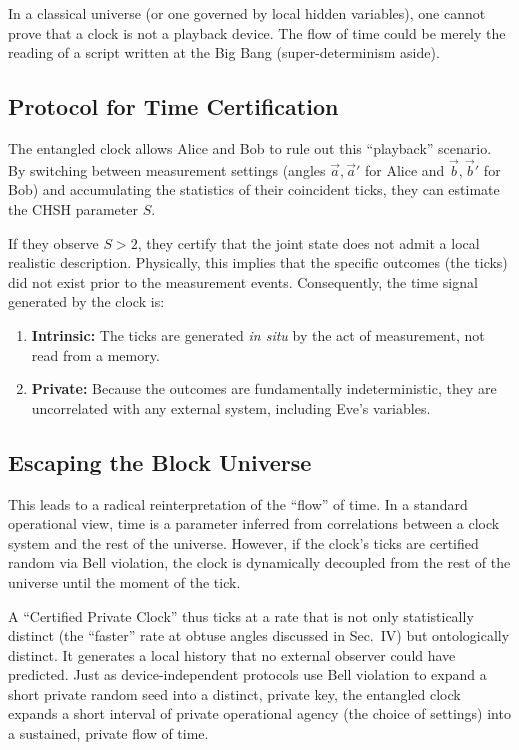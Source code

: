 \documentclass[entropy,article,submit,moreauthors,pdftex]{Definitions/mdpi}
\begin{document}
In a classical universe (or one governed by local hidden variables), one cannot prove that a clock is not a playback device. The flow of time could be merely the reading of a script written at the Big Bang (super-determinism aside).

\subsection{Protocol for Time Certification}
The entangled clock allows Alice and Bob to rule out this ``playback'' scenario. By switching between measurement settings (angles $\vec{a}, \vec{a}'$ for Alice and $\vec{b}, \vec{b}'$ for Bob) and accumulating the statistics of their coincident ticks, they can estimate the CHSH parameter $S$.

If they observe $S > 2$, they certify that the joint state does not admit a local realistic description. Physically, this implies that the specific outcomes (the ticks) did not exist prior to the measurement events.
Consequently, the time signal generated by the clock is:
\begin{enumerate}
    \item \textbf{Intrinsic:} The ticks are generated \emph{in situ} by the act of measurement, not read from a memory.
    \item \textbf{Private:} Because the outcomes are fundamentally indeterministic, they are uncorrelated with any external system, including Eve's variables.
\end{enumerate}

\subsection{Escaping the Block Universe}
This leads to a radical reinterpretation of the ``flow'' of time. In a standard operational view, time is a parameter inferred from correlations between a clock system and the rest of the universe. However, if the clock's ticks are certified random via Bell violation, the clock is dynamically decoupled from the rest of the universe until the moment of the tick.

A ``Certified Private Clock'' thus ticks at a rate that is not only statistically distinct (the ``faster'' rate at obtuse angles discussed in Sec.~IV) but ontologically distinct. It generates a local history that no external observer could have predicted. Just as device-independent protocols use Bell violation to expand a short private random seed into a distinct, private key, the entangled clock expands a short interval of private operational agency (the choice of settings) into a sustained, private flow of time.
\end{document}
